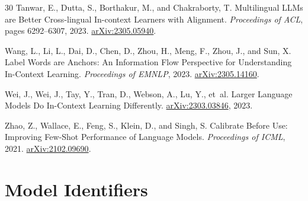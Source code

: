 \documentclass[11pt,a4paper]{article}
\begin{document}
\begin{thebibliography}{30}
Tanwar, E., Dutta, S., Borthakur, M., and Chakraborty, T.
\newblock Multilingual LLMs are Better Cross-lingual In-context Learners with Alignment.
\newblock \emph{Proceedings of ACL}, pages 6292--6307, 2023.
\newblock \href{https://arxiv.org/abs/2305.05940}{arXiv:2305.05940}.

Wang, L., Li, L., Dai, D., Chen, D., Zhou, H., Meng, F., Zhou, J., and Sun, X.
\newblock Label Words are Anchors: An Information Flow Perspective for Understanding In-Context Learning.
\newblock \emph{Proceedings of EMNLP}, 2023.
\newblock \href{https://arxiv.org/abs/2305.14160}{arXiv:2305.14160}.

Wei, J., Wei, J., Tay, Y., Tran, D., Webson, A., Lu, Y., et~al.
\newblock Larger Language Models Do In-Context Learning Differently.
\newblock \href{https://arxiv.org/abs/2303.03846}{arXiv:2303.03846}, 2023.

Zhao, Z., Wallace, E., Feng, S., Klein, D., and Singh, S.
\newblock Calibrate Before Use: Improving Few-Shot Performance of Language Models.
\newblock \emph{Proceedings of ICML}, 2021.
\newblock \href{https://arxiv.org/abs/2102.09690}{arXiv:2102.09690}.

\end{thebibliography}

\appendix
\section{Model Identifiers}
\end{document}
